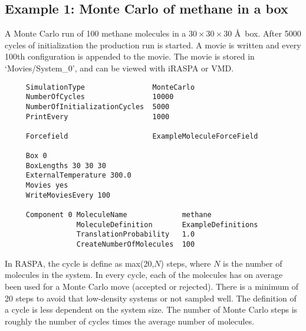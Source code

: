 \subsection*{Example 1: Monte Carlo of methane in a box}
A Monte Carlo run of 100 methane molecules in a $30\times30\times30$ \AA\ box.
After 5000 cycles of initialization the production run is started.
A movie is written and every 100th configuration is appended to the movie.
The movie is stored in `Movies/System\_0',
and can be viewed with iRASPA or VMD.

\begin{tiny}
\begin{verbatim}
     SimulationType                MonteCarlo
     NumberOfCycles                10000
     NumberOfInitializationCycles  5000
     PrintEvery                    1000

     Forcefield                    ExampleMoleculeForceField

     Box 0
     BoxLengths 30 30 30
     ExternalTemperature 300.0
     Movies yes
     WriteMoviesEvery 100

     Component 0 MoleculeName             methane
                 MoleculeDefinition       ExampleDefinitions
                 TranslationProbability   1.0
                 CreateNumberOfMolecules  100

\end{verbatim}
\end{tiny}

In RASPA, the cycle is define as max(20,$N$) steps, where $N$ is the number of molecules in the system. In every cycle, each of the molecules
has on average been used for a Monte Carlo move (accepted or rejected). There is a minimum of 20 steps to avoid that low-density
systems or not sampled well. The definition of a cycle is less dependent on the system size. The number of Monte Carlo steps
is roughly the number of cycles times the average number of molecules.

